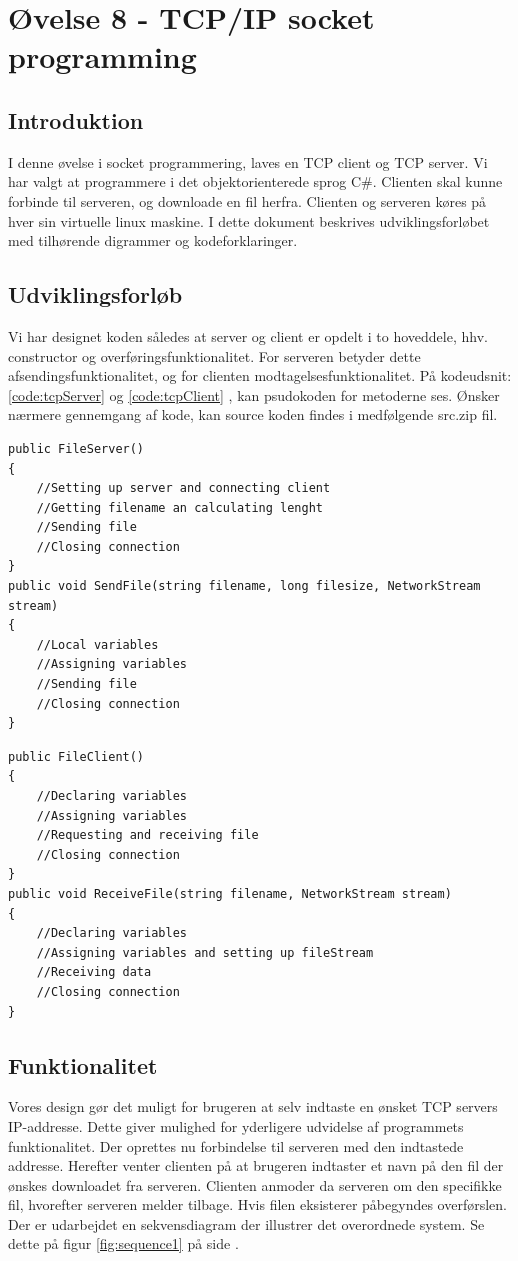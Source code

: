 \section{Øvelse 8 - TCP/IP socket programming}

\subsection{Introduktion}
I denne øvelse i socket programmering, laves en TCP client og TCP server. Vi har valgt at programmere i det objektorienterede sprog C\#. Clienten skal kunne forbinde til serveren, og downloade en fil herfra. Clienten og serveren køres på hver sin virtuelle linux maskine. I dette dokument beskrives udviklingsforløbet med tilhørende digrammer og kodeforklaringer.
\subsection{Udviklingsforløb}
Vi har designet koden således at server og client er opdelt i to hoveddele, hhv. constructor og overføringsfunktionalitet. For serveren betyder dette afsendingsfunktionalitet, og for clienten modtagelsesfunktionalitet. På kodeudsnit: \ref{code:tcpServer}  og \ref{code:tcpClient} , kan psudokoden for metoderne ses. Ønsker nærmere gennemgang af kode, kan source koden findes i medfølgende src.zip fil.

\begin{lstlisting}[caption = Hoveddesign for server,label=code:tcpServer]
public FileServer()
{
	//Setting up server and connecting client
	//Getting filename an calculating lenght
	//Sending file 
	//Closing connection
}
public void SendFile(string filename, long filesize, NetworkStream stream)
{
	//Local variables
	//Assigning variables
	//Sending file
	//Closing connection
}
\end{lstlisting}

\begin{lstlisting}[caption = Hoveddesign for client,label=code:tcpClient]
public FileClient()
{
	//Declaring variables
	//Assigning variables
	//Requesting and receiving file
	//Closing connection
}
public void ReceiveFile(string filename, NetworkStream stream)
{
	//Declaring variables
	//Assigning variables and setting up fileStream
	//Receiving data
	//Closing connection
}
\end{lstlisting}

\subsection{Funktionalitet}
Vores design gør det muligt for brugeren at selv indtaste en ønsket TCP servers IP-addresse. Dette giver mulighed for yderligere udvidelse af programmets funktionalitet. Der oprettes nu forbindelse til serveren med den indtastede addresse. Herefter venter clienten på at brugeren indtaster et navn på den fil der ønskes downloadet fra serveren. Clienten  anmoder da serveren om den specifikke fil, hvorefter serveren melder tilbage. Hvis filen eksisterer påbegyndes overførslen. Der er udarbejdet en sekvensdiagram der illustrer det overordnede system. Se dette på figur \ref{fig:sequence1} på side \pageref{fig:sequence1}.

